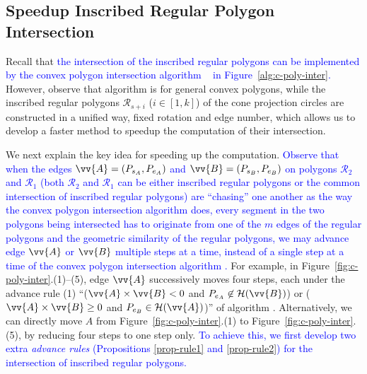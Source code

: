 \subsection{Speedup Inscribed Regular Polygon Intersection}
\label{subsec-fastRPI}

Recall that \textcolor{blue}{the intersection of the inscribed regular polygons can be implemented by the convex polygon intersection algorithm \cpia~\cite{ORourke:Intersection} in Figure~\ref{alg:c-poly-inter}. }
However, observe that algorithm \cpia is for general convex polygons, while the inscribed regular polygons $\mathcal{R}_{s+i}$ ($i\in[1, k]$) of the cone projection circles are constructed in a unified way, \ie fixed rotation and edge number,
which allows us to develop a faster method to speedup the computation of their intersection.

We next explain the key idea for speeding up the computation. \textcolor{blue}{Observe that when the edges $\vv{A} = (P_{s_A}, P_{e_A})$ and $\vv{B} = (P_{s_B}, P_{e_B})$ on polygons $\mathcal{R}_2$ and $\mathcal{R}_1$ (both $\mathcal{R}_2$ and $\mathcal{R}_1$ can be either inscribed regular polygons or the common intersection of inscribed regular polygons) are ``chasing'' one another as the way the convex polygon intersection algorithm \cpia does, every segment in the two polygons being intersected has to originate from one of the $m$ edges of the regular polygons and the geometric similarity of the regular polygons, we may advance edge $\vv{A}$ or $\vv{B}$ multiple steps at a time, instead of a single step at a time of the convex polygon intersection algorithm \cpia.}
%
For example, in Figure~\ref{fig:c-poly-inter}.(1)--(5), edge $\vv{A}$ successively moves four steps, each under the advance rule (1) ``($\vv{A} \times \vv{B} < 0$ and $P_{e_A} \not \in \mathcal{H}(\vv{B})$) or ($\vv{A} \times \vv{B} \ge 0$ and $P_{e_B} \in \mathcal{H}(\vv{A})$)'' of algorithm \cpia.
Alternatively, we can directly move $A$ from Figure~\ref{fig:c-poly-inter}.(1) to Figure~\ref{fig:c-poly-inter}.(5), by reducing four steps to one step only.
\textcolor{blue}{To achieve this, we first develop two extra \emph{advance rules} (Propositions \ref{prop-rule1} and \ref{prop-rule2}) for the intersection of inscribed regular polygons.}

